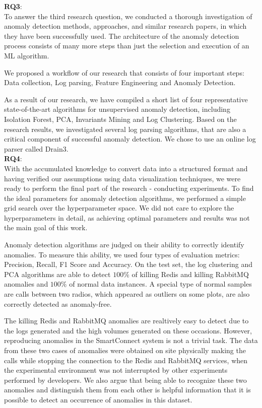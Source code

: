 \textbf{RQ3}: \textit{\RQThird}\\

To answer the third research question, we conducted a thorough investigation of anomaly detection methods, approaches, and similar research papers, in which they have been successfully used. The architecture of the anomaly detection process consists of many more steps than just the selection and execution of an ML algorithm. 

We proposed a workflow of our research that consists of four important steps: Data collection, Log parsing, Feature Engineering and Anomaly Detection.

As a result of our research, we have compiled a short list of four representative state-of-the-art algorithms for unsupervised anomaly detection, including Isolation Forest, PCA, Invariants Mining and Log Clustering. Based on the research results, we investigated several log parsing algorithms, that are also a critical component of successful anomaly detection. We chose to use an online log parser called Drain3.\\

\textbf{RQ4}: \textit{\RQFourth}\\

With the accumulated knowledge to convert data into a structured format and having verified our assumptions using data visualization techniques, we were ready to perform the final part of the research - conducting experiments. To find the ideal parameters for anomaly detection algorithms, we performed a simple grid search over the hyperparameter space. We did not care to explore the hyperparameters in detail, as achieving optimal parameters and results was not the main goal of this work. 

Anomaly detection algorithms are judged on their ability to correctly identify anomalies. To measure this ability, we used four types of evaluation metrics: Precision, Recall, F1 Score and Accuracy. On the test set, the log clustering and PCA algorithms are able to detect $100 \%$ of killing Redis and killing RabbitMQ anomalies and $100 \%$ of normal data instances. A special type of normal samples are calls between two radios, which appeared as outliers on some plots, are also correctly detected as anomaly-free. 

The killing Redis and RabbitMQ anomalies are realtively easy to detect due to the logs generated and the high volumes generated on these occasions. However, reproducing anomalies in the SmartConnect system is not a trivial task. The data from these two cases of anomalies were obtained on site physically making the calls while stopping the connection to the Redis and RabbitMQ services, when the experimental environment was not interrupted by other experiments performed by developers. 
We also argue that being able to recognize these two anomalies and distinguish them from each other is helpful information that it is possible to detect an occurrence of anomalies in this dataset. 

